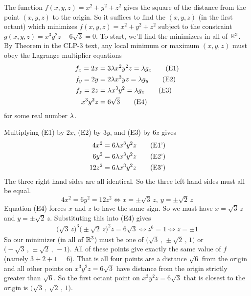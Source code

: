 \begin{solution}
The function $f(x,y,z)=x^2+y^2+z^2$ gives the square of the distance from 
the point $(x,y,z)$ to the origin. So it suffices to find the $(x,y,z)$
(in the first octant) which minimizes $f(x,y,z)=x^2+y^2+z^2$ subject 
to the constraint $g(x,y,z) = x^3y^2z -6\sqrt{3}=0$.
To start, we'll find the minimizers in all of $\mathbb{R}^3$.
By Theorem  in the CLP-3 text, any local minimum
or maximum $(x,y,z)$ must obey the  Lagrange multiplier equations
\begin{align*}
f_x = 2x &= 3 \lambda x^2y^2z = \lambda g_x \tag{E1} \\ 
f_y = 2y &=2 \lambda x^3 yz = \lambda g_y \tag{E2} \\ 
f_z = 2z &= \lambda x^3y^2 = \lambda g_z \tag{E3} \\ 
x^3y^2z &= 6\sqrt{3} \tag{E4}
\end{align*}
for some real number $\lambda$.

Multiplying (E1) by $2x$, (E2) by $3y$, and (E3) by $6z$ gives
\begin{align*}
4x^2 &= 6 \lambda x^3y^2z  \tag{E1'} \\ 
6y^2 &= 6 \lambda x^3y^2z  \tag{E2'} \\ 
12z^2&= 6 \lambda x^3y^2z  \tag{E3'} 
\end{align*}
The three right hand sides are all identical. So the three left hand sides
must all be equal.
\begin{equation*}
4x^2=6y^2=12z^2
\iff
x=\pm\sqrt{3}\, z,\ 
y=\pm\sqrt{2}\, z
\end{equation*}
Equation (E4) forces $x$ and $z$ to have the same sign.
So we must have $x=\sqrt{3}\,z$ and $y=\pm \sqrt{2}\,z$. 
Substituting this into (E4) gives
\begin{align*}
\big(\sqrt{3}\,z\big)^3 \big(\pm \sqrt{2}\,z\big)^2 z=6\sqrt{3}
\iff
z^6=1
\iff
z=\pm 1
\end{align*}
So our minimizer (in all of $\mathbb{R}^3$) must be one of
$\big(\sqrt{3}\,,\,\pm\sqrt{2}\,,\,1\big)$ or
$\big(-\sqrt{3}\,,\,\pm\sqrt{2}\,,\,-1\big)$. All of these
points give exactly the same value of $f$ (namely $3+2+1=6$).
That is all four points are a distance $\sqrt{6}$ from the origin
and all other points on $x^3y^2z=6\sqrt{3}$ have distance from the origin
strictly greater than $\sqrt{6}$.
So the first octant point on  $x^3y^2z=6\sqrt{3}$ that is closest
to the origin is $\big(\sqrt{3}\,,\,\sqrt{2}\,,\,1\big)$.
\end{solution}


